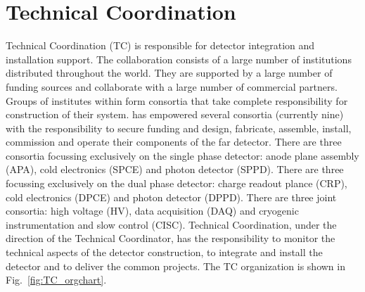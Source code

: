 \chapter{Technical Coordination}
\label{ch:fdsp-coord}

Technical Coordination (TC) is responsible for detector integration
and installation support. 
The  collaboration consists of a large number of
institutions distributed throughout the world. They are supported by a
large number of funding sources and collaborate with a large number of
commercial partners. Groups of institutes within  form
consortia that take complete responsibility for construction of their
system.   has empowered several consortia (currently nine)
with the responsibility to secure funding and design, fabricate,
assemble, install, commission and operate their components of the
 far detector. There are three consortia focussing
exclusively on the single phase detector: anode plane assembly (APA),
cold electronics (SPCE) and photon detector (SPPD). There are three
focussing exclusively on the dual phase detector: charge readout
plance (CRP), cold electronics (DPCE) and photon detector
(DPPD). There are three joint consortia: high voltage (HV), data
acquisition (DAQ) and cryogenic instrumentation and slow control
(CISC).   Technical Coordination, under the direction of
the  Technical Coordinator, has the responsibility to
monitor the technical aspects of the detector construction, to
integrate and install the detector and to deliver the common projects. The
 TC organization is shown in Fig.~\ref{fig:TC_orgchart}.
